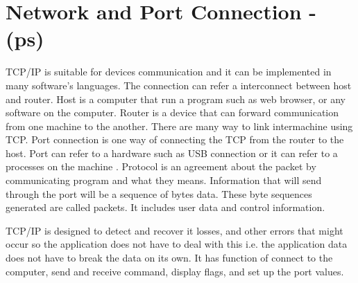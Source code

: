 \section{Network and Port Connection - (ps)}

TCP/IP is suitable for devices communication and it can be implemented in many software's languages.
The connection can refer a interconnect between host and router.
Host is a computer that run a program such as web browser, or any software on the computer\cite{davidB}.
Router is a device that can forward communication from one machine to the another.
There are many way to link intermachine using TCP.
Port connection is one way of connecting the TCP from the router to the host.
Port can refer to a hardware such as USB connection or it can refer to a processes on the machine \cite{normanM}.
Protocol is an agreement about the packet by communicating program and what they means.
Information that will send through the port will be a sequence of bytes data. 
These byte sequences generated are called packets\cite{davidB}.
It includes user data and control information.

TCP/IP is designed to detect and recover it losses, and other errors that might occur so the application does not have to deal with this \cite{davidB} i.e. the application data does not have to break the data on its own. It has function of connect to the computer, send and receive command, display flags, and set up the port values.


 
